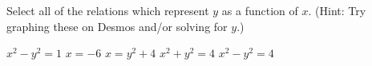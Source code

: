 \documentclass{ximera}
\author{Elizabeth Miller}
\begin{document}
\licenseSZ
\begin{exercise}
Select all of the relations which represent  $y$ as a function of $x$. (Hint: Try graphing these on Desmos and/or solving for $y$.)

\begin{selectAll}
\choice
{
$x^{2} - y^{2} = 1$
}\choice
{
$x = -6$
}\choice
{
$x = y^2 + 4$
}
\choice
{
 $x^2 + y^2 = 4$
}\choice
{
$x^2 - y^2 = 4$
}
\end{selectAll}

\end{exercise}
\end{document}

